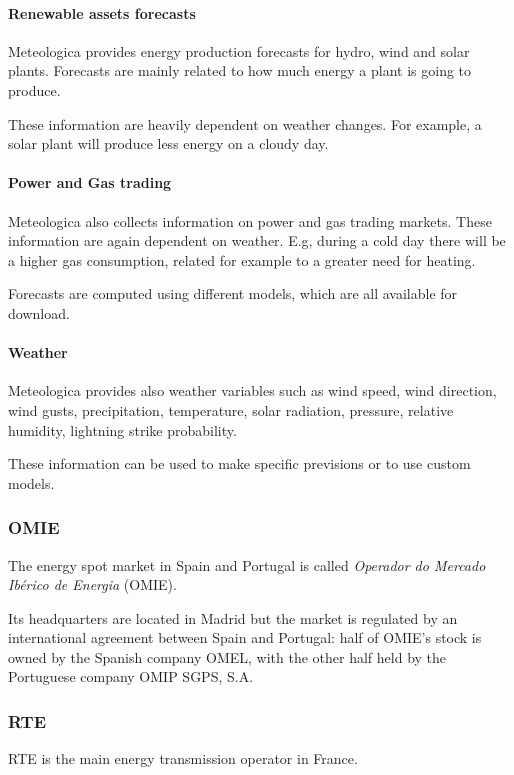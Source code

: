     \paragraph{Renewable assets forecasts}
        Meteologica provides energy production forecasts for hydro, wind and solar plants.
        Forecasts are mainly related to how much energy a plant is going to produce.
        
        These information are heavily dependent on weather changes. For example, a solar plant will produce less energy on a cloudy day.
        
    \paragraph{Power and Gas trading}
        Meteologica also collects information on power and gas trading markets.
        These information are again dependent on weather.
        E.g, during a cold day there will be a higher gas consumption, related for example to a greater need for heating.
        
        Forecasts are computed using different models, which are all available for download.
        
    \paragraph{Weather}
        Meteologica provides also weather variables such as wind speed, wind direction, wind gusts, precipitation, temperature, solar radiation, pressure, relative humidity, lightning strike probability.
        
        These information can be used to make specific previsions or to use custom models.

\subsubsection{OMIE}
    The energy spot market in Spain and Portugal is called \textit{Operador do Mercado Ibérico de Energia} (OMIE).

    Its headquarters are located in Madrid but the market is regulated by an international agreement between Spain and Portugal: half of OMIE’s stock is owned by the Spanish company OMEL, with the other half held by the Portuguese company OMIP SGPS, S.A.\cite{bib:omie:description}

\subsubsection{RTE} \label{section:providers:rte}
    RTE is the main energy transmission operator in France.
    
